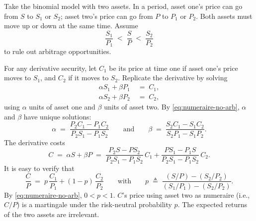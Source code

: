 \begin{eg}
	\label{eg:numeraire}
	Take the binomial model with two assets.
	In a period, asset one's price can go from $S$ to $S_{1}$ or $S_{2}$; asset two's price can go from $P$ to $P_{1}$ or $P_{2}$.
	Both assets must move up or down at the same time.
	Assume
	\begin{equation}
		\frac{S_{1}}{P_{1}} \;<\; \frac{S}{P} \;<\; \frac{S_{2}}{P_{2}}
		\label{eq:numeraire-no-arb}
	\end{equation}
	to rule out arbitrage opportunities.

	For any derivative security, let $C_{1}$ be its price at time one if asset one's price moves to $S_{1}$, and $C_{2}$ if it moves to $S_{2}$.
	Replicate the derivative by solving
	\begin{align*}
		\alpha S_{1}+\beta P_{1} & \;=\; C_{1} , \\
		\alpha S_{2}+\beta P_{2} & \;=\; C_{2} ,
	\end{align*}
	using $\alpha$ units of asset one and $\beta$ units of asset two.
	By \eqref{eq:numeraire-no-arb}, $\alpha$ and $\beta$ have unique solutions:
	\[
		\alpha \;=\; \frac{P_{2}C_{1}-P_{1}C_{2}}{P_{2}S_{1}-P_{1}S_{2}}
		\qquad\text{and}\qquad
		\beta \;=\; \frac{S_{2}C_{1}-S_{1}C_{2}}{S_{2}P_{1}-S_{1}P_{2}} .
	\]
	The derivative costs
	\[
		C \;=\; \alpha S+\beta P \;=\; \frac{P_{2}S-PS_{2}}{P_{2}S_{1}-P_{1}S_{2}}\,C_{1}+\frac{PS_{1}-P_{1}S}{P_{2}S_{1}-P_{1}S_{2}}\,C_{2} .
	\]
	It is easy to verify that
	\begin{equation}
		\frac{C}{P} \;=\; p\,\frac{C_{1}}{P_{1}}+(1-p)\,\frac{C_{2}}{P_{2}}
		\qquad\text{with}\qquad
		p \;\triangleq\; \frac{(S/P)-(S_{2}/P_{2})}{(S_{1}/P_{1})-(S_{2}/P_{2})} .
		\label{eq:numeraire-p}
	\end{equation}
	By \eqref{eq:numeraire-no-arb}, $0<p<1$.
	$C$'s price using asset two as numeraire (i.e., $C/P$) is a martingale under the risk-neutral probability $p$.
	The expected returns of the two assets are irrelevant.
\end{eg}

\suppstart
{}

